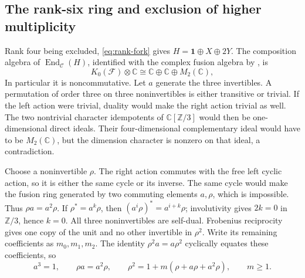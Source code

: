 \documentclass[11pt,a4paper]{article}
\theoremstyle{definition}
\begin{document}
\subsection{The rank-six ring and exclusion of higher multiplicity}

Rank four being excluded, \eqref{eq:rank-fork} gives
$H=\mathbf1\oplus X\oplus2Y$. The composition algebra of
$\operatorname{End}_{\mathcal C}(H)$, identified with the complex
fusion algebra by \cite[Corollary~3.4]{BJ}, is
\[
 K_0(\mathcal F)\otimes\mathbb C
 \cong\mathbb C\oplus\mathbb C\oplus M_2(\mathbb C),
\]
In particular it is noncommutative. Let $a$ generate the three
invertibles. A permutation of order three on three noninvertibles
is either transitive or trivial. If the left action were trivial,
duality would make the right action trivial as well. The two nontrivial
character idempotents of $\mathbb C[\mathbb Z/3]$ would then be
one-dimensional direct ideals. Their four-dimensional complementary
ideal would have to be $M_2(\mathbb C)$, but the dimension character
is nonzero on that ideal, a contradiction.

Choose a noninvertible $\rho$. The right action commutes with the free
left cyclic action, so it is either the same cycle or its inverse.
The same cycle would make the fusion ring generated by two commuting
elements $a,\rho$, which is impossible. Thus $\rho a=a^2\rho$.
If $\rho^*=a^k\rho$, then
$(a^i\rho)^*=a^{i+k}\rho$; involutivity gives $2k=0$ in
$\mathbb Z/3$, hence $k=0$. All three noninvertibles are self-dual.
Frobenius reciprocity gives one copy of the unit and no other
invertible in $\rho^2$. Write its remaining coefficients as
$m_0,m_1,m_2$. The identity $\rho^2a=a\rho^2$ cyclically equates
these coefficients, so
\begin{equation}
 a^3=1,\qquad\rho a=a^2\rho,\qquad
 \rho^2=1+m(\rho+a\rho+a^2\rho),\qquad m\ge1.
 \label{eq:rank6-ring}
\end{equation}
\end{document}
